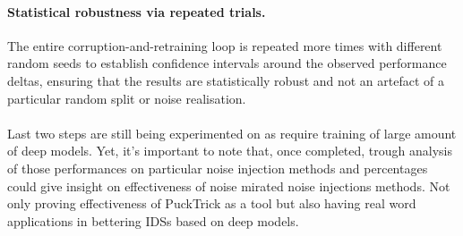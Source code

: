 \documentclass{article}
\begin{document}
\paragraph{Statistical robustness via repeated trials.}
      The entire corruption-and-retraining loop is repeated more times with
      different random seeds to establish confidence intervals around the
      observed performance deltas, ensuring that the results are
      statistically robust and not an artefact of a particular random
      split or noise realisation.

\paragraph{}
Last two steps are still being experimented on as require training of large amount of deep models. Yet, it's important to note that, once completed, trough analysis of those performances on particular noise injection methods and percentages could give insight on effectiveness of noise mirated noise injections methods. Not only proving effectiveness of PuckTrick as a tool but also having real word applications in bettering IDSs based on deep models. 
\end{document}
